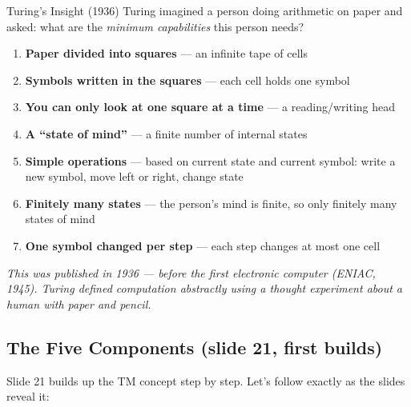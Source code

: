 \documentclass[11pt,a4paper]{article}
\begin{document}
\begin{notebox}{Turing's Insight (1936)}
Turing imagined a person doing arithmetic on paper and asked: what are the \textit{minimum capabilities} this person needs?

\begin{enumerate}
\item \textbf{Paper divided into squares} --- an infinite tape of cells
\item \textbf{Symbols written in the squares} --- each cell holds one symbol
\item \textbf{You can only look at one square at a time} --- a reading/writing head
\item \textbf{A ``state of mind''} --- a finite number of internal states
\item \textbf{Simple operations} --- based on current state and current symbol: write a new symbol, move left or right, change state
\item \textbf{Finitely many states} --- the person's mind is finite, so only finitely many states of mind
\item \textbf{One symbol changed per step} --- each step changes at most one cell
\end{enumerate}

\textit{This was published in 1936 --- before the first electronic computer (ENIAC, 1945). Turing defined computation abstractly using a thought experiment about a human with paper and pencil.}
\end{notebox}

\subsection{The Five Components (slide 21, first builds)}

Slide 21 builds up the TM concept step by step. Let's follow exactly as the slides reveal it:
\end{document}
